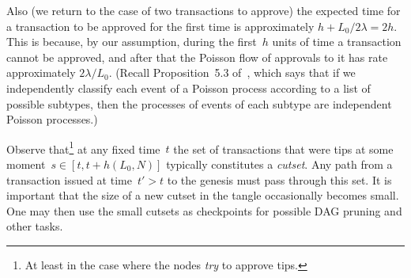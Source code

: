 \documentclass[12pt]{article}
\begin{document}
Also (we return to the case of two transactions to approve) 
the expected time for a transaction to be 
approved for the first time is approximately $h+L_0/2\lambda=2h$.
This is because, by our assumption, during the first~$h$
units of time a transaction cannot be approved, and after
that the Poisson flow
of approvals to it has rate approximately $2\lambda/L_0$. 
(Recall Proposition~5.3 of~\cite{Ross_m}, which says 
that if we independently classify each event of a Poisson process
according to a list of possible subtypes,
then the processes of events of each subtype 
are independent Poisson processes.)

Observe that\footnote{At least in the case where the nodes
\emph{try} to approve tips.} at any fixed time~$t$ the set 
of transactions that were tips
at some moment~$s\in[t,t+h(L_0,N)]$ typically
constitutes a \emph{cutset}. 
Any path from 
a transaction issued at time~$t'>t$ to the genesis must pass
through this set. It is important that the size of 
a new cutset in the tangle occasionally becomes small. 
One may then 
use the small cutsets as checkpoints for possible DAG pruning
and other tasks.

\end{document}
